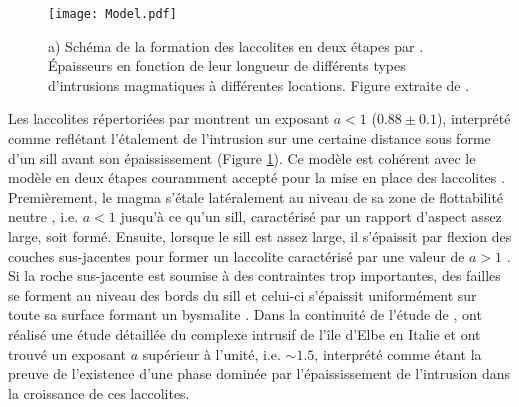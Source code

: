 \begin{figure}[htpb]
 \begin{center}
 \graphicspath{ {/Users/thorey/Documents/These/Manuscript/Figure/Chapter1/} }
 \texttt{[image: Model.pdf]}
 \caption{a) Schéma de la formation des laccolites en deux étapes
 par \citet{McCaffrey:1997ea}. Épaisseurs en fonction de leur
 longueur de différents types d'intrusions magmatiques à
 différentes locations. Figure extraite de \citet{Cruden:tg}.}
 \label{C1-Model}
 \end{center}
\end{figure}

Les laccolites répertoriées par \citet{E:2015tl} montrent un exposant
$a<1$ ($0.88 \pm 0.1$), interprété comme reflétant l'étalement de
l'intrusion sur une certaine distance sous forme d'un sill avant son
épaississement (Figure \ref{C1-Model}). Ce modèle est cohérent avec le
modèle en deux étapes couramment accepté pour la mise en place des
laccolites \citep{Johnson:1973ho,McCaffrey:1997ea}. Premièrement, le
magma s'étale latéralement au niveau de sa zone de flottabilité neutre
, i.e. $a<1$ jusqu'à ce qu'un sill, caractérisé par un rapport
d'aspect assez large, soit formé. Ensuite, lorsque le sill est assez
large, il s'épaissit par flexion des couches sus-jacentes pour former
un laccolite caractérisé par une valeur de $a>1$
\citep{Johnson:1973ho,Koch:1981if}. Si la roche sus-jacente est
soumise à des contraintes trop importantes, des failles se forment au
niveau des bords du sill et celui-ci s'épaissit uniformément sur toute
sa surface formant un bysmalite \citep{E:2015tl}. Dans la continuité
de l'étude de \citet{McCaffrey:1997ea}, \citet{Rocchi:2002jy} ont
réalisé une étude détaillée du complexe intrusif de l'île d'Elbe en
Italie et ont trouvé un exposant $a$ supérieur à l'unité, i.e.
$\sim 1.5$, interprété comme étant la preuve de l'existence d'une
phase dominée par l'épaississement de l'intrusion dans la croissance
de ces laccolites.

